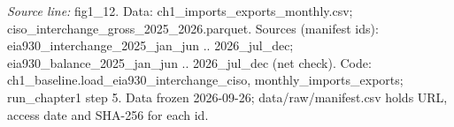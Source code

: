{\scriptsize\textit{Source line:} fig1\_\allowbreak{}12. Data: ch1\_\allowbreak{}imports\_\allowbreak{}exports\_\allowbreak{}monthly.csv; ciso\_\allowbreak{}interchange\_\allowbreak{}gross\_\allowbreak{}2025\_\allowbreak{}2026.parquet. Sources (manifest ids): eia930\_\allowbreak{}interchange\_\allowbreak{}2025\_\allowbreak{}jan\_\allowbreak{}jun .. 2026\_\allowbreak{}jul\_\allowbreak{}dec; eia930\_\allowbreak{}balance\_\allowbreak{}2025\_\allowbreak{}jan\_\allowbreak{}jun .. 2026\_\allowbreak{}jul\_\allowbreak{}dec (net check). Code: ch1\_\allowbreak{}baseline.load\_\allowbreak{}eia930\_\allowbreak{}interchange\_\allowbreak{}ciso, monthly\_\allowbreak{}imports\_\allowbreak{}exports; run\_\allowbreak{}chapter1 step 5. Data frozen 2026-09-26; data/raw/manifest.csv holds URL, access date and SHA-256 for each id.}
